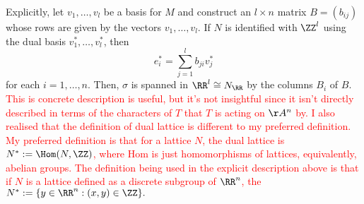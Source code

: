 Explicitly, let $v_1, \ldots, v_l$ be a basis for $M$ and construct an $l \times n$ matrix $B=(b_{ij})$ whose rows are given by the vectors $v_1, \ldots, v_l$.
If $N$ is identified with $\ZZ^l$ using the dual basis $v_1^*, \ldots, v_l^*$, then
$$e_i^* = \sum_{j=1}^l b_{ji} v_j^*$$
for each $i=1, \ldots, n.$
Then, $\sigma$ is spanned in $\RR^l \cong N_\RR$ by the columns $B_i$ of $B$.
\textcolor{red}{
This is concrete description is useful, but it's not insightful since it isn't directly described in terms of the characters of $T$ that $T$ is acting on $\AA^n$ by. 
I also realised that the definition of dual lattice is different to my preferred definition.
My preferred definition is that for a lattice $N$, the dual lattice is $N^* := \Hom(N, \ZZ)$, where $\mathrm{Hom}$ is just homomorphisms of lattices, equivalently, abelian groups.
The definition being used in the explicit description above is that if $N$ is a lattice defined as a discrete subgroup of $\RR^n$, the $N^* := \{y \in \RR^n : (x, y) \in \ZZ\}.$
}

